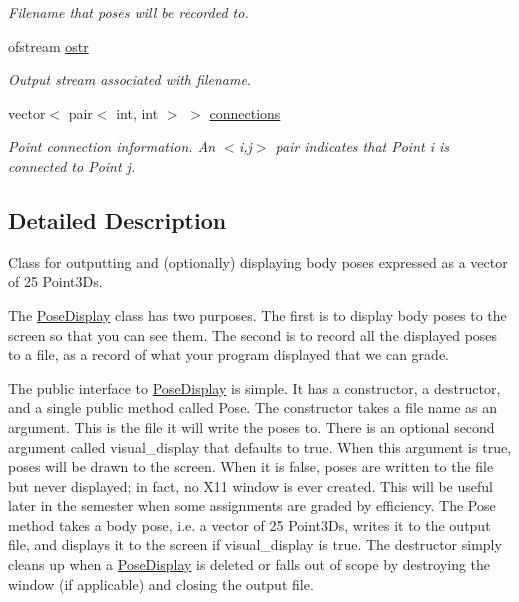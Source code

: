 \begin{DoxyCompactItemize}
\begin{DoxyCompactList}\small\item\em Filename that poses will be recorded to. \end{DoxyCompactList}\item 
\hypertarget{classPoseDisplay_aa50c8842e3aff32a56a560e0199c81a8}{}ofstream \hyperlink{classPoseDisplay_aa50c8842e3aff32a56a560e0199c81a8}{ostr}\label{classPoseDisplay_aa50c8842e3aff32a56a560e0199c81a8}

\begin{DoxyCompactList}\small\item\em Output stream associated with filename. \end{DoxyCompactList}\item 
\hypertarget{classPoseDisplay_a85f6a7c05c2c97113cb614a15b2867e4}{}vector$<$ pair$<$ int, int $>$ $>$ \hyperlink{classPoseDisplay_a85f6a7c05c2c97113cb614a15b2867e4}{connections}\label{classPoseDisplay_a85f6a7c05c2c97113cb614a15b2867e4}

\begin{DoxyCompactList}\small\item\em Point connection information. An $<$i,j$>$ pair indicates that Point i is connected to Point j. \end{DoxyCompactList}\end{DoxyCompactItemize}


\subsection{Detailed Description}
Class for outputting and (optionally) displaying body poses expressed as a vector of 25 Point3\+Ds. 

The \hyperlink{classPoseDisplay}{Pose\+Display} class has two purposes. The first is to display body poses to the screen so that you can see them. The second is to record all the displayed poses to a file, as a record of what your program displayed that we can grade.

The public interface to \hyperlink{classPoseDisplay}{Pose\+Display} is simple. It has a constructor, a destructor, and a single public method called Pose. The constructor takes a file name as an argument. This is the file it will write the poses to. There is an optional second argument called visual\+\_\+display that defaults to true. When this argument is true, poses will be drawn to the screen. When it is false, poses are written to the file but never displayed; in fact, no X11 window is ever created. This will be useful later in the semester when some assignments are graded by efficiency. The Pose method takes a body pose, i.\+e. a vector of 25 Point3\+Ds, writes it to the output file, and displays it to the screen if visual\+\_\+display is true. The destructor simply cleans up when a \hyperlink{classPoseDisplay}{Pose\+Display} is deleted or falls out of scope by destroying the window (if applicable) and closing the output file. 

